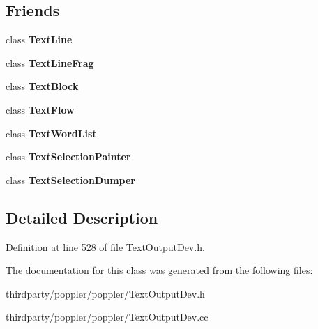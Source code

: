\subsection*{Friends}
\begin{DoxyCompactItemize}
\item 
\mbox{\label{class_text_page_a47df881e8259564a58fb3a0f656e1c98}} 
class {\bfseries Text\+Line}
\item 
\mbox{\label{class_text_page_acb07d216fef09d9e1ff8e8029eb90bd3}} 
class {\bfseries Text\+Line\+Frag}
\item 
\mbox{\label{class_text_page_a10941693a31766eabb041642470df529}} 
class {\bfseries Text\+Block}
\item 
\mbox{\label{class_text_page_a013da25b06e986abc9b0f46aa906eae8}} 
class {\bfseries Text\+Flow}
\item 
\mbox{\label{class_text_page_ab6d080596abe41783ce85827de349c49}} 
class {\bfseries Text\+Word\+List}
\item 
\mbox{\label{class_text_page_a478e1ac9857fe7ba0b2079ce49d24e78}} 
class {\bfseries Text\+Selection\+Painter}
\item 
\mbox{\label{class_text_page_af2dbf093feb7a4386dbeeb5bf5423f29}} 
class {\bfseries Text\+Selection\+Dumper}
\end{DoxyCompactItemize}


\subsection{Detailed Description}


Definition at line 528 of file Text\+Output\+Dev.\+h.



The documentation for this class was generated from the following files\+:\begin{DoxyCompactItemize}
\item 
thirdparty/poppler/poppler/Text\+Output\+Dev.\+h\item 
thirdparty/poppler/poppler/Text\+Output\+Dev.\+cc\end{DoxyCompactItemize}

